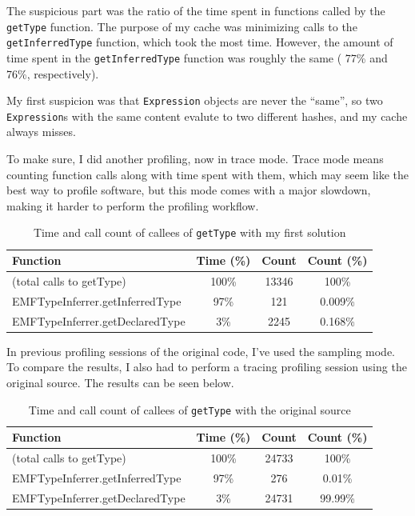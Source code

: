 \documentclass[11pt,a4paper,oneside]{report}
\begin{document}
The suspicious part was the ratio of the time spent in functions called by the
\texttt{getType} function. The purpose of my cache was minimizing calls to the
\texttt{getInferredType} function, which took the most time. However, the amount
of time spent in the \texttt{getInferredType} function was roughly the same (
77\% and 76\%, respectively).

My first suspicion was that \texttt{Expression} objects are never the ``same'',
so two \texttt{Expression}s with the same content evalute to two different
hashes, and my cache always misses.

\pagebreak

To make sure, I did another profiling, now in trace mode. Trace mode means
counting function calls along with time spent with them, which may seem like the
best way to profile software, but this mode comes with a major slowdown, making
it harder to perform the profiling workflow.

\begin{table}[ht]
    \footnotesize
    \centering
    \begin{tabular}{ l c c c }
        \toprule
        Function & Time (\%) & Count & Count (\%) \\
        \midrule
        (total calls to getType) & 100\% & 13346 & 100\% \\
        EMFTypeInferrer.getInferredType & 97\% & 121 & 0.009\% \\
        EMFTypeInferrer.getDeclaredType & 3\% & 2245 & 0.168\% \\
        \bottomrule
    \end{tabular}
    \caption{Time and call count of callees of \texttt{getType} with my first solution}
    \label{tab:first-solution-call-counts}
\end{table}

In previous profiling sessions of the original code, I've used the sampling
mode. To compare the results, I also had to perform a tracing profiling session
using the original source. The results can be seen below.

\begin{table}[ht]
    \footnotesize
    \centering
    \begin{tabular}{ l c c c }
        \toprule
        Function & Time (\%) & Count & Count (\%) \\
        \midrule
        (total calls to getType) & 100\% & 24733 & 100\% \\
        EMFTypeInferrer.getInferredType & 97\% & 276 & 0.01\% \\
        EMFTypeInferrer.getDeclaredType & 3\% & 24731 & 99.99\% \\
        \bottomrule
    \end{tabular}
    \caption{Time and call count of callees of \texttt{getType} with the original source}
    \label{tab:first-solution-call-counts}
\end{table}
\end{document}
